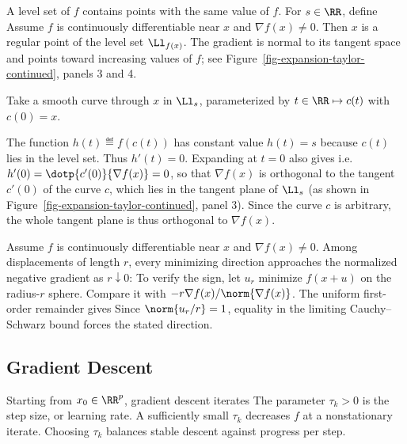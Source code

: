 \begin{rem}
	A level set of $f$ contains points with the same value of $f$. For $s \in \RR$, define
	Assume $f$ is continuously differentiable near $x$ and $\nabla f(x)\neq0$. Then $x$ is a regular point of the level set $\Ll_{f(x)}$. The gradient is normal to its tangent space and points toward increasing values of $f$; see Figure~\ref{fig-expansion-taylor-continued}, panels 3 and 4.
	 
	Take a smooth curve through $x$ in $\Ll_s$, parameterized by $t \in \RR \mapsto c(t)$ with $c(0)=x$.
	  
	The function $h(t) \eqdef f(c(t))$ has constant value $h(t)=s$ because $c(t)$ lies in the level set. Thus $h'(t)=0$. Expanding at $t=0$ also gives
	i.e. $h'(0) = \dotp{c'(0)}{\nabla f(x)}=0$, so that $\nabla f(x)$ is orthogonal to the tangent $c'(0)$ of the curve $c$, which lies in the tangent plane of $\Ll_s$  (as shown in Figure~\ref{fig-expansion-taylor-continued}, panel 3).  Since the curve $c$ is arbitrary, the whole tangent plane is thus orthogonal to $\nabla f(x)$.
\end{rem}

\begin{rem}
	Assume $f$ is continuously differentiable near $x$ and $\nabla f(x)\neq0$. Among displacements of length $r$, every minimizing direction approaches the normalized negative gradient as $r\downarrow0$:
To verify the sign, let $u_r$ minimize $f(x+u)$ on the radius-$r$ sphere. Compare it with $-r\nabla f(x)/\norm{\nabla f(x)}$. The uniform first-order remainder gives
Since $\norm{u_r/r}=1$, equality in the limiting Cauchy--Schwarz bound forces the stated direction.
\end{rem}


                                                                                  
\subsection{Gradient Descent}

Starting from $x_0 \in \RR^p$, gradient descent iterates
The parameter $\tau_k>0$ is the step size, or learning rate. A sufficiently small $\tau_k$ decreases $f$ at a nonstationary iterate. Choosing $\tau_k$ balances stable descent against progress per step.
 
